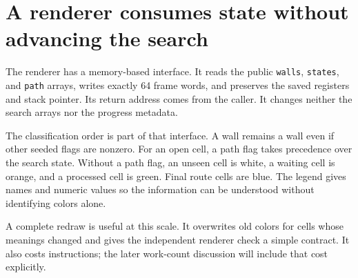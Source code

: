 \section{A renderer consumes state without advancing the search}\label{maze-p04}

The renderer has a memory-based interface. It reads the public \texttt{walls}, \texttt{states}, and \texttt{path} arrays, writes exactly 64 frame words, and preserves the saved registers and stack pointer. Its return address comes from the caller. It changes neither the search arrays nor the progress metadata.

The classification order is part of that interface. A wall remains a wall even if other seeded flags are nonzero. For an open cell, a path flag takes precedence over the search state. Without a path flag, an unseen cell is white, a waiting cell is orange, and a processed cell is green. Final route cells are blue. The legend gives names and numeric values so the information can be understood without identifying colors alone.

A complete redraw is useful at this scale. It overwrites old colors for cells whose meanings changed and gives the independent renderer check a simple contract. It also costs instructions; the later work-count discussion will include that cost explicitly.
